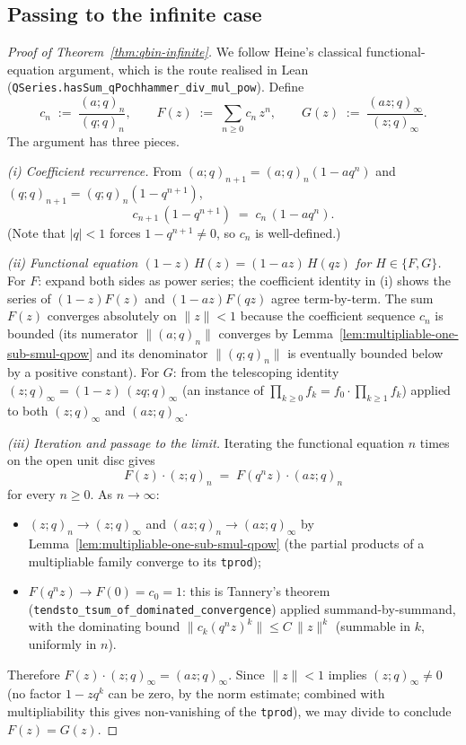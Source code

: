 \subsection{Passing to the infinite case}

\begin{proof}[Proof of Theorem~\ref{thm:qbin-infinite}]\leanok
{}
We follow Heine's classical functional-equation argument, which is the route
realised in Lean (\texttt{QSeries.hasSum\_qPochhammer\_div\_mul\_pow}). Define
\[
  c_n \;:=\; \frac{(a;q)_n}{(q;q)_n}, \qquad
  F(z) \;:=\; \sum_{n \ge 0} c_n\, z^n, \qquad
  G(z) \;:=\; \frac{(a z;q)_\infty}{(z;q)_\infty}.
\]
The argument has three pieces.

\emph{(i) Coefficient recurrence.} From $(a;q)_{n+1} = (a;q)_n(1 - a q^n)$ and
$(q;q)_{n+1} = (q;q)_n(1 - q^{n+1})$,
\[
  c_{n+1}\,(1 - q^{n+1}) \;=\; c_n\,(1 - a q^n).
\]
(Note that $|q| < 1$ forces $1 - q^{n+1} \neq 0$, so $c_n$ is well-defined.)

\emph{(ii) Functional equation $(1-z)\,H(z) = (1-az)\,H(qz)$ for $H \in \{F, G\}$.}
For $F$: expand both sides as power series; the coefficient identity in (i)
shows the series of $(1-z) F(z)$ and $(1-az) F(qz)$ agree term-by-term. The
sum $F(z)$ converges absolutely on $\|z\| < 1$ because the coefficient
sequence $c_n$ is bounded (its numerator $\|(a;q)_n\|$ converges by
Lemma~\ref{lem:multipliable-one-sub-smul-qpow} and its denominator $\|(q;q)_n\|$
is eventually bounded below by a positive constant).
For $G$: from the telescoping identity $(z;q)_\infty = (1-z)\,(zq;q)_\infty$
(an instance of $\prod_{k\ge 0} f_k = f_0 \cdot \prod_{k\ge 1} f_k$) applied
to both $(z;q)_\infty$ and $(az;q)_\infty$.

\emph{(iii) Iteration and passage to the limit.} Iterating the functional
equation $n$ times on the open unit disc gives
\[
  F(z) \cdot (z;q)_n \;=\; F(q^n z) \cdot (a z;q)_n
\]
for every $n \ge 0$. As $n \to \infty$:
\begin{itemize}
  \item $(z;q)_n \to (z;q)_\infty$ and $(az;q)_n \to (az;q)_\infty$ by
    Lemma~\ref{lem:multipliable-one-sub-smul-qpow} (the partial products of a
    multipliable family converge to its \texttt{tprod});
  \item $F(q^n z) \to F(0) = c_0 = 1$: this is Tannery's theorem
    (\texttt{tendsto\_tsum\_of\_dominated\_convergence}) applied summand-by-summand,
    with the dominating bound $\|c_k (q^n z)^k\| \le C\,\|z\|^k$ (summable in
    $k$, uniformly in $n$).
\end{itemize}
Therefore $F(z) \cdot (z;q)_\infty = (a z;q)_\infty$. Since $\|z\| < 1$
implies $(z;q)_\infty \neq 0$ (no factor $1 - z q^k$ can be zero, by the
norm estimate; combined with multipliability this gives non-vanishing of the
\texttt{tprod}), we may divide to conclude $F(z) = G(z)$. \qedhere
\end{proof}

